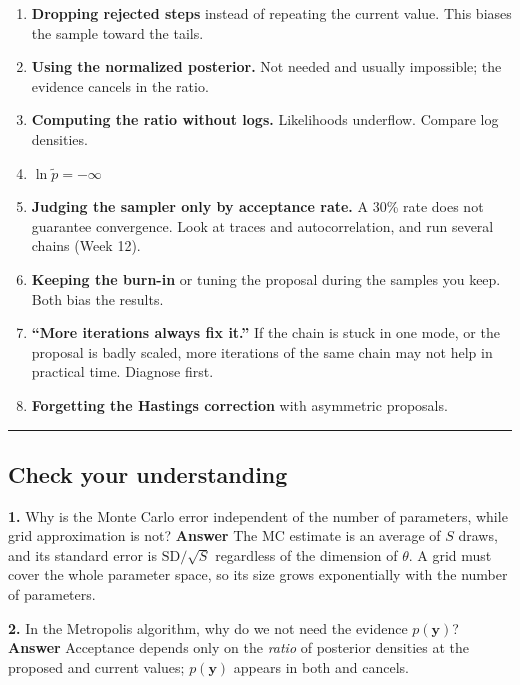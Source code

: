\begin{enumerate}
\def\labelenumi{\arabic{enumi}.}
\tightlist
\item
  \textbf{Dropping rejected steps} instead of repeating the current
  value. This biases the sample toward the tails.
\item
  \textbf{Using the normalized posterior.} Not needed and usually
  impossible; the evidence cancels in the ratio.
\item
  \textbf{Computing the ratio without logs.} Likelihoods underflow.
  Compare log densities.
\item
  \(\ln\tilde p = -\infty\)
\item
  \textbf{Judging the sampler only by acceptance rate.} A 30\% rate does
  not guarantee convergence. Look at traces and autocorrelation, and run
  several chains (Week 12).
\item
  \textbf{Keeping the burn-in} or tuning the proposal during the samples
  you keep. Both bias the results.
\item
  \textbf{``More iterations always fix it.''} If the chain is stuck in
  one mode, or the proposal is badly scaled, more iterations of the same
  chain may not help in practical time. Diagnose first.
\item
  \textbf{Forgetting the Hastings correction} with asymmetric proposals.
\end{enumerate}

\begin{center}\rule{0.5\linewidth}{0.5pt}\end{center}

\subsection{Check your understanding}

\textbf{1.} Why is the Monte Carlo error independent of the number of
parameters, while grid approximation is not? \textbf{Answer} The MC
estimate is an average of \(S\) draws, and its standard error is
\(\mathrm{SD}/\sqrt{S}\) regardless of the dimension of \(\theta\). A
grid must cover the whole parameter space, so its size grows
exponentially with the number of parameters.

\textbf{2.} In the Metropolis algorithm, why do we not need the evidence
\(p(\mathbf{y})\)? \textbf{Answer} Acceptance depends only on the
\emph{ratio} of posterior densities at the proposed and current values;
\(p(\mathbf{y})\) appears in both and cancels.


